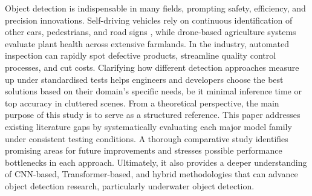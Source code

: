 Object detection is indispensable in many fields, prompting safety, efficiency, and precision innovations. Self-driving vehicles rely on continuous identification of other cars, pedestrians, and road signs \cite{mdpi2023comparative}, while drone-based agriculture systems evaluate plant health across extensive farmlands. \cite{mdpi2024enhancing} In the industry, automated inspection can rapidly spot defective products, streamline quality control processes, and cut costs.\cite{mdpi2025survey} Clarifying how different detection approaches measure up under standardised tests helps engineers and developers choose the best solutions based on their domain’s specific needs, be it minimal inference time or top accuracy in cluttered scenes.\cite{medium2024vision}
From a theoretical perspective, the main purpose of this study is to serve as a structured reference. This paper addresses existing literature gaps by systematically evaluating each major model family under consistent testing conditions. A thorough comparative study identifies promising areas for future improvements and stresses possible performance bottlenecks in each approach. Ultimately, it also provides a deeper understanding of CNN-based, Transformer-based, and hybrid methodologies that can advance object detection research, particularly underwater object detection. \cite{mdpi2024enhancing}
